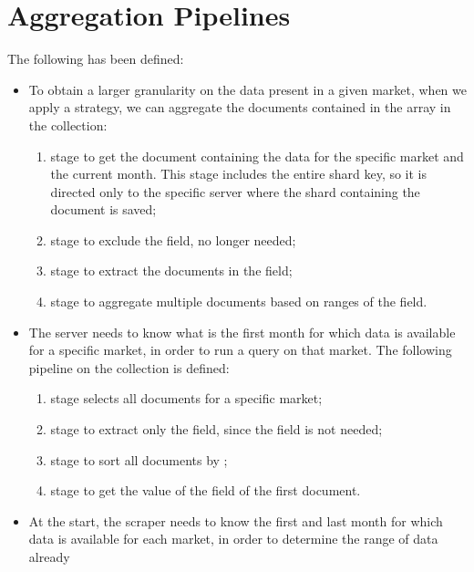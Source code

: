 \section{Aggregation Pipelines}\label{sec:aggregations}

The following  has been defined:

\begin{itemize}
	\item To obtain a larger granularity on the data present in a given
		market, when we apply a strategy, we can aggregate the
		documents contained in the  array in the
		 collection:
		\begin{enumerate}
			\item {} stage to get the document
				containing the data for the specific market and
				the current month. This stage includes the
				entire shard key, so it is directed only to the
				specific server where the shard containing the
				document is saved;
			\item {} stage to exclude the 
				field, no longer needed;
			\item {} stage to extract the documents in
				the  field;
			\item {} stage to aggregate multiple
				documents based on ranges of the  field.
		\end{enumerate}
	\item The server needs to know what is the first month for which data is
		available for a specific market, in order to run a query on that
		market. The following pipeline on the 
		collection is defined:
		\begin{enumerate}
			\item {} stage selects all documents for a
				specific market;
			\item {} stage to extract only the
				 field, since the  field
				is not needed;
			\item {} stage to sort all documents by
				;
			\item {} stage to get the value of the
				 field of the first document.
		\end{enumerate}
	\item At the start, the scraper needs to know the
		first and last month for which data is available for each
		market, in order to determine the range of data already

\end{itemize}
